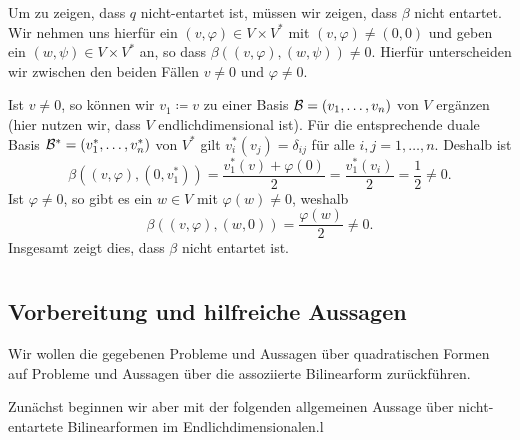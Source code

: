 \documentclass[a4paper,10pt,numbers=noenddot]{scrartcl}
\begin{document}
Um zu zeigen, dass $q$ nicht-entartet ist, müssen wir zeigen, dass $\beta$ nicht entartet.
Wir nehmen uns hierfür ein $(v, \varphi) \in V \times V^*$ mit $(v, \varphi) \neq (0,0)$ und geben ein $(w, \psi) \in V \times V^*$ an, so dass $\beta((v, \varphi), (w, \psi)) \neq 0$.
Hierfür unterscheiden wir zwischen den beiden Fällen $v \neq 0$ und $\varphi \neq 0$.

Ist $v \neq 0$, so können wir $v_1 \coloneqq v$ zu einer Basis $\mathcal{B} = (v_1, \dotsc, v_n)$ von $V$ ergänzen (hier nutzen wir, dass $V$ endlichdimensional ist).
Für die entsprechende duale Basis $\mathcal{B}^* = (v_1^*, \dotsc, v_n^*)$ von $V^*$ gilt $v_i^*(v_j) = \delta_{ij}$ für alle $i,j = 1, \dotsc, n$.
Deshalb ist
\[
        \beta((v, \varphi), (0, v_1^*))
  =     \frac{v_1^*(v) + \varphi(0)}{2}
  =     \frac{v_1^*(v_i)}{2}
  =     \frac{1}{2}
  \neq  0.
\]
Ist $\varphi \neq 0$, so gibt es ein $w \in V$ mit $\varphi(w) \neq 0$, weshalb
\[
    \beta((v, \varphi), (w,0))
  = \frac{\varphi(w)}{2}
  \neq 0.
\]
Insgesamt zeigt dies, dass $\beta$ nicht entartet ist.










\section{}





\subsection{Vorbereitung und hilfreiche Aussagen}


Wir wollen die gegebenen Probleme und Aussagen über quadratischen Formen auf Probleme und Aussagen über die assoziierte Bilinearform zurückführen.


Zunächst beginnen wir aber mit der folgenden allgemeinen Aussage über nicht-entartete Bilinearformen im Endlichdimensionalen.l
\end{document}
